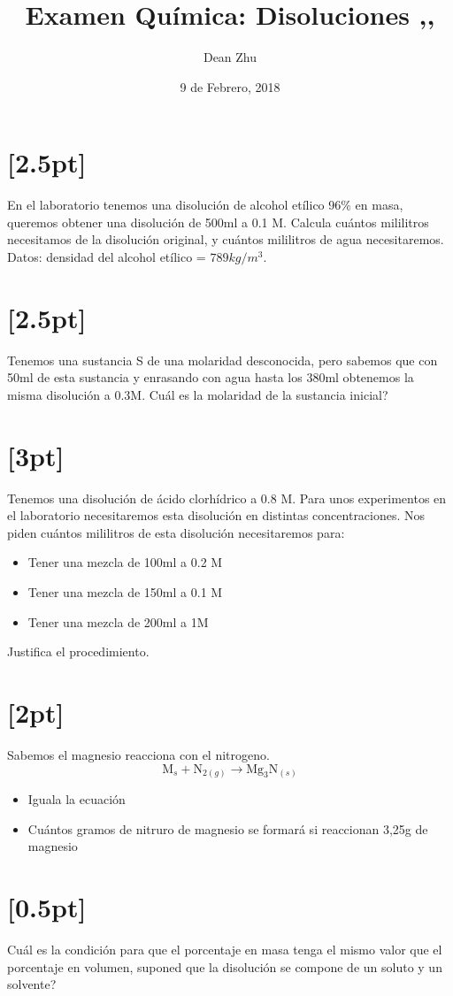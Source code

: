 \documentclass[11pt]{article}
\author{Dean Zhu}
\date{9 de Febrero, 2018}
\title{Examen Química: Disoluciones
,,}
\begin{document}
\maketitle
\section{[2.5pt]}
\label{sec:org3540b65}
En el laboratorio tenemos una disolución de alcohol etílico 96\% en masa, queremos obtener una disolución de 500ml a 0.1 M. Calcula cuántos mililitros necesitamos de la disolución original, y cuántos mililitros de agua necesitaremos. \\
Datos: densidad del alcohol etílico = \(789kg/m^{3}\).

\section{[2.5pt]}
\label{sec:orgf175bfa}
Tenemos una sustancia S de una molaridad desconocida, pero sabemos que con 50ml de esta sustancia y enrasando con agua hasta los 380ml obtenemos la misma disolución a 0.3M. Cuál es la molaridad de la sustancia inicial?

\section{[3pt]}
\label{sec:org73262a9}
Tenemos una disolución de ácido clorhídrico a 0.8 M. Para unos experimentos en el laboratorio necesitaremos esta disolución en distintas concentraciones. Nos piden cuántos mililitros de esta disolución necesitaremos para:
\begin{itemize}
\item Tener una mezcla de 100ml a 0.2 M
\item Tener una mezcla de 150ml a 0.1 M
\item Tener una mezcla de 200ml a 1M
\end{itemize}
Justifica el procedimiento.

\section{[2pt]}
\label{sec:org96d5564}
Sabemos el magnesio reacciona con el nitrogeno.
\[ \text{M}_{s} + \text{N}_{2(g)} \rightarrow \text{Mg}_{3}\text{N}_{(s)} \]
\begin{itemize}
\item Iguala la ecuación
\item Cuántos gramos de nitruro de magnesio se formará si reaccionan 3,25g de magnesio
\end{itemize}

\section{[0.5pt]}
\label{sec:orgcc8700a}
Cuál es la condición para que el porcentaje en masa tenga el mismo valor que el porcentaje en volumen, suponed que la disolución se compone de un soluto y un solvente?
\end{document}

